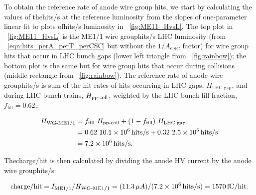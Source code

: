To obtain the reference rate of anode wire group hits, we start by calculating the values of the\unit{hits/s} at the reference luminosity  from the slopes of one-parameter linear fit to plots of\unit{hits/s} \vs luminosity in \FigDot~\ref{fig:ME11_HvsL}. The top plot in \FigDot~\ref{fig:ME11_HvsL} is the ME1/1 wire group\unit{hits/s} \vs LHC luminosity (from \Eq~\ref{eqn:hits_perA_perT_perCSC} but without the $1 / A_\text{CSC}$ factor) for wire group hits that occur in LHC bunch gaps (lower left triangle from \FigDot~\ref{fig:rainbow}); the bottom plot is the same but for wire group hits that occur during \pp collisions (middle rectangle from \FigDot~\ref{fig:rainbow}). The reference rate of anode wire group\unit{hits/s} is sum of the hit rates of hits occurring in LHC gaps, $H_\text{LHC gap}$, and during LHC bunch trains, $H_\text{\pp-coll}$, weighted by the LHC bunch fill fraction, $f_\text{fill} = 0.62$,: 

\begin{equation}
	\begin{split}
	\label{eqn:hit_rate_calc}
	H_{\text{WG-ME1/1}} &= f_{\text{fill}} \  H_\text{\pp-coll} + (1-f_{\text{fill}}) \  H_{\text{LHC gap}} \\
	&= 0.62  \  10.1\times10^6 \unit{hits/s} + 0.32  \  2.5\times10^{5} \unit{hits/s} \\
	&= 7.2 \times 10^{6}\unit{hits/s}.
\end{split}
\end{equation}

The\unit{charge/hit} is then calculated by dividing the anode HV current by the anode wire group\unit{hits/s}:

\begin{equation}
	\label{eqn:ME11_chph_calc}
	\text{\text{charge}/\text{hit}} = I_{\text{ME1/1}}/H_{\text{WG-ME1/1}} = (11.3 \,\mu A)/(7.2 \times 10^{6}\text{\,hits/s}) = 1570\text{\,fC/hit}.
\end{equation}



